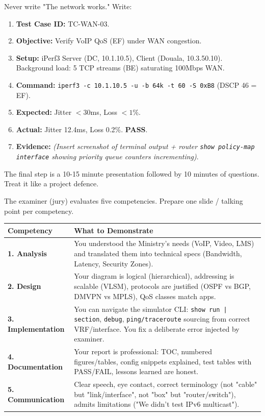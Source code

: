 \documentclass[11pt]{article}
\newcounter{popsec}
\newcounter{popsub}
\newcommand{\courssub}[1]{%
  \stepcounter{popsub}%
  \par\vspace{9pt}\noindent{\popxbold\fontsize{11.5}{13}\selectfont\color{popink}{\color{poporange}\thepopsec.\thepopsub}\hspace{6pt}#1}\par\nopagebreak\vspace{4pt}
}
\begin{document}
\begin{methode}
Never write "The network works." Write:
\begin{enumerate}
    \item \textbf{Test Case ID:} TC-WAN-03.
    \item \textbf{Objective:} Verify VoIP QoS (EF) under WAN congestion.
    \item \textbf{Setup:} iPerf3 Server (DC, 10.1.10.5), Client (Douala, 10.3.50.10). Background load: 5 TCP streams (BE) saturating 100Mbps WAN.
    \item \textbf{Command:} \texttt{iperf3 -c 10.1.10.5 -u -b 64k -t 60 -S 0xB8} (DSCP 46 = EF).
    \item \textbf{Expected:} Jitter $< 30$ms, Loss $< 1$\%.
    \item \textbf{Actual:} Jitter 12.4ms, Loss 0.2\%. \textbf{PASS}.
    \item \textbf{Evidence:} \textit{(Insert screenshot of terminal output + router \texttt{show policy-map interface} showing priority queue counters incrementing)}.
\end{enumerate}
\end{methode}

\courssub{Oral Defence: Simulated GCE Jury}

The final step is a 10-15 minute presentation followed by 10 minutes of questions. Treat it like a project defence.

\begin{aretenir}
The examiner (jury) evaluates five competencies. Prepare one slide / talking point per competency.
\begin{center}
\begin{tabularx}{\linewidth}{|l|X|}\hline
\textbf{Competency} & \textbf{What to Demonstrate} \\ \hline
\textbf{1. Analysis} & You understood the Ministry's needs (VoIP, Video, LMS) and translated them into technical specs (Bandwidth, Latency, Security Zones). \\ \hline
\textbf{2. Design} & Your diagram is logical (hierarchical), addressing is scalable (VLSM), protocols are justified (OSPF vs BGP, DMVPN vs MPLS), QoS classes match apps. \\ \hline
\textbf{3. Implementation} & You can navigate the simulator CLI: \texttt{show run | section}, \texttt{debug}, \texttt{ping/traceroute} sourcing from correct VRF/interface. You fix a deliberate error injected by examiner. \\ \hline
\textbf{4. Documentation} & Your report is professional: TOC, numbered figures/tables, config snippets explained, test tables with PASS/FAIL, lessons learned are honest. \\ \hline
\textbf{5. Communication} & Clear speech, eye contact, correct terminology (not "cable" but "link/interface", not "box" but "router/switch"), admits limitations ("We didn't test IPv6 multicast"). \\ \hline
\end{tabularx}
\end{center}
\end{aretenir}
\end{document}
